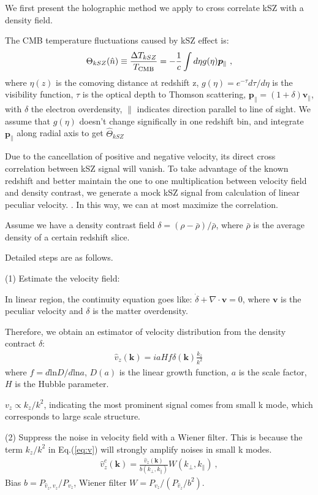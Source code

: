 We first present the holographic method\cite{11Shao} we apply 
to cross correlate kSZ with a density field. 

\label{sec:kszRecon}
The CMB temperature fluctuations caused by kSZ effect is:
\begin{eqnarray}
\label{eq:ksz}
\Theta_{kSZ}(\hat n)\equiv\frac{\Delta T_{kSZ}}{T_{\mathrm{CMB}}}
=-\frac{1}{c}\int d\eta  g(\eta)  \bm{p}_\parallel\ ,
\end{eqnarray}
where $\eta(z)$ is the comoving distance at redshift z, $g(\eta)=e^{-\tau} d\tau/d\eta$ is the visibility function, $\tau$ is the optical depth to Thomson scattering, $\bm{p}_\parallel=(1+\delta)\bm{v}_\parallel$, with $\delta$ the electron overdensity, $\parallel$ indicates direction parallel to line of sight. 
We assume that $g(\eta)$ doesn't change significally in one redshift bin, 
and integrate $\bm{p}_\parallel$ along radial axis to get $\hat \Theta_{kSZ}$

Due to the cancellation of positive and negative velocity, its direct cross correlation between kSZ signal will vanish.
To take advantage of the known redshift and better maintain the one to one multiplication between velocity field and density contrast,   
we generate a mock kSZ signal from calculation of linear peculiar velocity. 
\cite{Shao11}.
In this way, we can at most maximize the correlation.

Assume we have a density contrast field $\delta=(\rho-\bar{\rho})/\bar{\rho}$, where $\bar\rho$ is the average density of a certain redshift slice. 

Detailed steps are as follows.

(1) Estimate the velocity field:

In linear region, the continuity equation goes like:
$\dot \delta+\nabla \cdot \bm{v}=0$, 
where $\bm{v}$ is the peculiar velocity and $\delta$ is the matter overdensity. 

Therefore, we obtain an estimator of velocity distribution from the density contract $\delta$:
\begin{eqnarray}
	\label{eq:v}
\hat v_z(\bm{k})=i a H f\delta(\bm{k})\frac{k_z}{k^2}\,
\end{eqnarray}
where $f=d\mathrm{ln}D/d\mathrm{ln}a$, $D(a)$ is the linear growth function, 
$a$ is the scale factor, $H$ is the Hubble parameter.

$v_z \propto k_z/k^2$, indicating the most prominent signal comes from small k mode, which corresponds to large scale structure. 

(2) Suppress the noise in velocity field with a Wiener filter. 
This is because the term $k_z/k^2$ in Eq.(\ref{eq:v}) will strongly amplify noises in small k modes. 
\begin{eqnarray}
	\label{eq:wienerv}
\hat v_z^c(\bm{k})=\frac{\hat v_z(\bm{k})}{b(k_\perp,k_\parallel)}W(k_\perp,k_\parallel)\ ,
\end{eqnarray}
Bias $b=P_{\hat v_z,v_z}/P_{v_z}$, Wiener filter $W=P_{v_z}/(P_{\hat v_z}/b^2)$.


